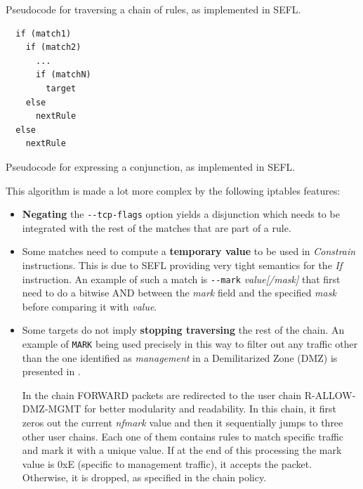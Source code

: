 {\begin{minipage}[t]{.45\textwidth}
\begin{listing}[H]
    \caption{Pseudocode for traversing a chain of rules, as implemented in
    SEFL.}
    \label{algo:if-then-else}
  \end{listing}
\end{minipage}\hfill
\begin{minipage}[t]{.45\textwidth}
  \begin{listing}[H]
    \lstset{numbers=none, frame=single}
    \begin{lstlisting}
  if (match1)
    if (match2)
      ...
      if (matchN)
        target
    else
      nextRule
  else
    nextRule
    \end{lstlisting}

    \caption{Pseudocode for expressing a conjunction, as implemented in SEFL.}
    \label{algo:if-then-else2}
  \end{listing}
\end{minipage}

This algorithm is made a lot more complex by the following iptables features:
\begin{itemize}
  \item \textbf{Negating} the \lstinline{--tcp-flags} option yields a
    disjunction which needs to be integrated with the rest of the matches
    that are part of a rule.
  \item Some matches need to compute a \textbf{temporary value} to be used in
    \emph{Constrain} instructions. This is due to SEFL providing very tight
    semantics for the \emph{If} instruction.  An example of such a match is
    \lstinline{--mark} \emph{value[/mask]} that first need to do a bitwise AND
    between the \emph{mark} field and the specified \emph{mask}
    before comparing it with \emph{value}.
  \item Some targets do not imply \textbf{stopping traversing} the rest of the
    chain.  An example of \texttt{MARK} being used precisely in this way to
    filter out any traffic other than the one identified as \emph{management}
    in a Demilitarized Zone (DMZ) is presented
    in .

    In the chain FORWARD packets are redirected to the user chain
    R-ALLOW-DMZ-MGMT for better modularity and readability.  In this chain, it
    first zeros out the current \emph{nfmark} value and then it sequentially
    jumps to three other user chains.  Each one of them contains rules to match
    specific traffic and mark it with a unique value.  If at the end of this
    processing the mark value is 0xE (specific to management traffic), it
    accepts the packet.  Otherwise, it is dropped, as specified in the chain
    policy.
\end{itemize}

}
